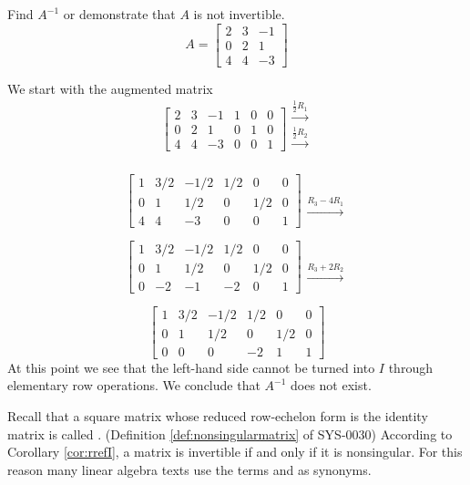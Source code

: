 \documentclass{ximera}
\begin{document}
\begin{example}\label{ex:findinverse2} Find $A^{-1}$ or demonstrate that $A$ is not invertible.
$$A=\begin{bmatrix}2&3&-1\\0&2&1\\4&4&-3\end{bmatrix}$$
\begin{explanation}
We start with the augmented matrix
$$\left[\begin{array}{ccc|ccc}  
 2&3&-1&1&0&0\\0&2&1&0&1&0\\4&4&-3&0&0&1
 \end{array}\right]
 \begin{array}{c}
 \xrightarrow{\frac{1}{2}R_1}\\
 \xrightarrow{\frac{1}{2}R_2}\\
\\
 \end{array}$$

 $$\left[\begin{array}{ccc|ccc}  
 1&3/2&-1/2&1/2&0&0\\0&1&1/2&0&1/2&0\\4&4&-3&0&0&1
 \end{array}\right]
 \begin{array}{c}
 \\
 \\
\xrightarrow{R_3-4R_1}
 \end{array}$$

 $$\left[\begin{array}{ccc|ccc}  
 1&3/2&-1/2&1/2&0&0\\0&1&1/2&0&1/2&0\\0&-2&-1&-2&0&1
 \end{array}\right]
 \begin{array}{c}
 \\
 \\
\xrightarrow{R_3+2R_2}
 \end{array}$$
 
 $$\left[\begin{array}{ccc|ccc}  
 1&3/2&-1/2&1/2&0&0\\0&1&1/2&0&1/2&0\\0&0&0&-2&1&1
 \end{array}\right]$$
 At this point we see that the left-hand side cannot be turned into $I$ through elementary row operations. We conclude that $A^{-1}$ does not exist.
\end{explanation}
\end{example}
\begin{remark}
Recall that a square matrix whose reduced row-echelon form is the identity matrix is called . (Definition \ref{def:nonsingularmatrix} of SYS-0030)
According to Corollary \ref{cor:rrefI}, a matrix is invertible if and only if it is nonsingular.  For this reason many linear algebra texts use the terms  and  as synonyms.
\end{remark}
\end{document}
